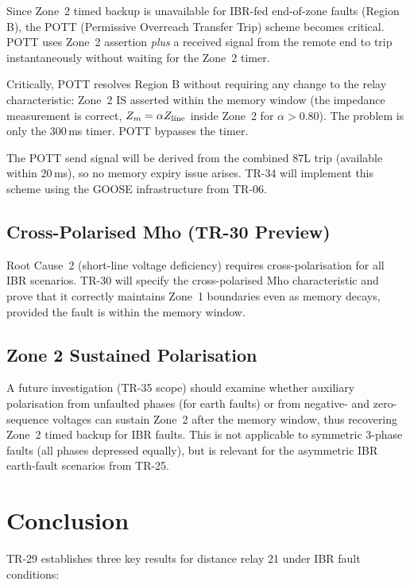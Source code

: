 \documentclass[11pt,a4paper]{article}
\begin{document}
Since Zone~2 timed backup is unavailable for IBR-fed end-of-zone faults
(Region B), the POTT (Permissive Overreach Transfer Trip) scheme becomes
critical.  POTT uses Zone~2 assertion \emph{plus} a received signal from
the remote end to trip instantaneously without waiting for the Zone~2 timer.

Critically, POTT resolves Region B without requiring any change to the
relay characteristic: Zone~2 IS asserted within the memory window
(the impedance measurement is correct, $Z_m = \alpha Z_{\rm line}$
inside Zone~2 for $\alpha > 0.80$).  The problem is only the 300\,ms
timer.  POTT bypasses the timer.

The POTT send signal will be derived from the combined 87L trip (available
within 20\,ms), so no memory expiry issue arises.  TR-34 will implement
this scheme using the GOOSE infrastructure from TR-06.

\subsection{Cross-Polarised Mho (TR-30 Preview)}

Root Cause~2 (short-line voltage deficiency) requires cross-polarisation
for all IBR scenarios.  TR-30 will specify the cross-polarised Mho
characteristic and prove that it correctly maintains Zone~1 boundaries
even as memory decays, provided the fault is within the memory window.

\subsection{Zone 2 Sustained Polarisation}

A future investigation (TR-35 scope) should examine whether auxiliary
polarisation from unfaulted phases (for earth faults) or from negative-
and zero-sequence voltages can sustain Zone~2 after the memory window,
thus recovering Zone~2 timed backup for IBR faults.  This is not
applicable to symmetric 3-phase faults (all phases depressed equally),
but is relevant for the asymmetric IBR earth-fault scenarios from TR-25.

\section{Conclusion}

TR-29 establishes three key results for distance relay 21 under IBR fault
conditions:
\end{document}

